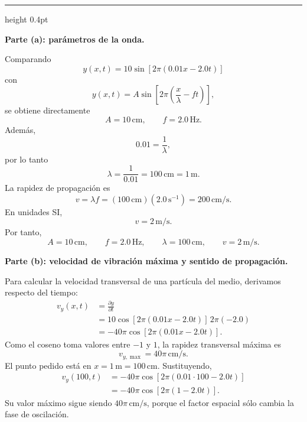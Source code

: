 \documentclass[11pt]{article}
\newcommand{\soluciontitulo}{%
  \par\medskip
  \noindent{\large\bfseries Solución.}\par
  \vspace{0.2em}\hrule height 0.4pt \vspace{0.7em}%
}
\newcommand{\paso}[1]{%
  \par\medskip
  \noindent\textbf{#1}\par
  \vspace{0.1em}%
}
\begin{document}
\soluciontitulo

\paso{Parte (a): par\'ametros de la onda.}
Comparando
\begin{equation*}
    y(x,t)=10\sin\left[2\pi(0.01x-2.0t)\right]
\end{equation*}
con
\begin{equation*}
    y(x,t)=A\sin\left[2\pi\left(\frac{x}{\lambda}-ft\right)\right],
\end{equation*}
se obtiene directamente
\begin{equation*}
    A=10\,\mathrm{cm},
    \qquad
    f=2.0\,\mathrm{Hz}.
\end{equation*}
Adem\'as,
\begin{equation*}
    0.01=\frac{1}{\lambda},
\end{equation*}
por lo tanto
\begin{equation*}
    \lambda=\frac{1}{0.01}=100\,\mathrm{cm}=1\,\mathrm{m}.
\end{equation*}
La rapidez de propagaci\'on es
\begin{equation*}
    v=\lambda f=(100\,\mathrm{cm})(2.0\,\mathrm{s}^{-1})=200\,\mathrm{cm/s}.
\end{equation*}
En unidades SI,
\begin{equation*}
    v=2\,\mathrm{m/s}.
\end{equation*}
Por tanto,
\begin{equation*}
    \boxed{A=10\,\mathrm{cm}},\qquad
    \boxed{f=2.0\,\mathrm{Hz}},\qquad
    \boxed{\lambda=100\,\mathrm{cm}},\qquad
    \boxed{v=2\,\mathrm{m/s}}.
\end{equation*}

\paso{Parte (b): velocidad de vibraci\'on m\'axima y sentido de propagaci\'on.}
Para calcular la velocidad transversal de una part\'icula del medio, derivamos respecto del tiempo:
\begin{align*}
    v_y(x,t)
    &=\frac{\partial y}{\partial t}\\
    &=10\cos\left[2\pi(0.01x-2.0t)\right]\,2\pi(-2.0)\\
    &=-40\pi\cos\left[2\pi(0.01x-2.0t)\right].
\end{align*}
Como el coseno toma valores entre $-1$ y $1$, la rapidez transversal m\'axima es
\begin{equation*}
    v_{y,\max}=40\pi\,\mathrm{cm/s}.
\end{equation*}
El punto pedido est\'a en $x=1\,\mathrm{m}=100\,\mathrm{cm}$. Sustituyendo,
\begin{align*}
    v_y(100,t)
    &=-40\pi\cos\left[2\pi(0.01\cdot100-2.0t)\right]\\
    &=-40\pi\cos\left[2\pi(1-2.0t)\right].
\end{align*}
Su valor m\'aximo sigue siendo $40\pi\,\mathrm{cm/s}$, porque el factor espacial s\'olo cambia la fase de oscilaci\'on.
\end{document}

